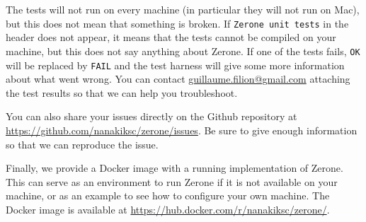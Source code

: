 \documentclass[12pt]{article}
\begin{document}
The tests will not run on every machine (in particular they will
not run on Mac), but this does not mean that something is broken.
If \texttt{Zerone unit tests} in the header does not appear, it
means that the tests cannot be compiled on your machine, but this
does not say anything about Zerone. If one of the tests fails,
\texttt{OK} will be replaced by \texttt{FAIL} and the test harness
will give some more information about what went wrong. You can contact
\href{mailto:guillaume.filion@gmail.com}{guillaume.filion@gmail.com}
attaching the test results so that we can help you troubleshoot.

You can also share your issues directly on the Github repository
at \url{https://github.com/nanakiksc/zerone/issues}. Be sure to give
enough information so that we can reproduce the issue.

Finally, we provide a Docker image with a running implementation
of Zerone. This can serve as an environment to run Zerone if it
is not available on your machine, or as an example to see how to
configure your own machine. The Docker image is available at
\url{https://hub.docker.com/r/nanakiksc/zerone/}.
\end{document}
